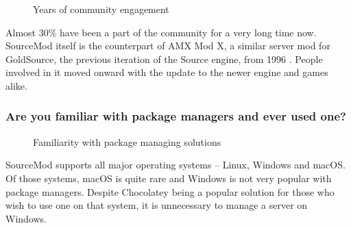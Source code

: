 \begin{figure}[H]
  \centering
  \caption{Years of community engagement}
  \label{fig:years-of-community-engangement}
\end{figure}

Almost 30\% have been a part of the community for a very long time now.
SourceMod itself is the counterpart of AMX Mod X, a similar server mod for GoldSource, the previous iteration of the Source engine, from 1996 \cite{valve-goldsrc}.
People involved in it moved onward with the update to the newer engine and games alike.

\subsubsection{Are you familiar with package managers and ever used one?}

\begin{figure}[H]
  \centering
  \caption{Familiarity with package managing solutions}
  \label{fig:familiarity-with-package-managing-solutions}
\end{figure}

SourceMod supports all major operating systems -- Linux, Windows and macOS\@.
Of those systems, macOS is quite rare and Windows is not very popular with package managers.
Despite Chocolatey \cite{chocolatey} being a popular solution for those who wish to use one on that system, it is unnecessary to manage a server on Windows.

